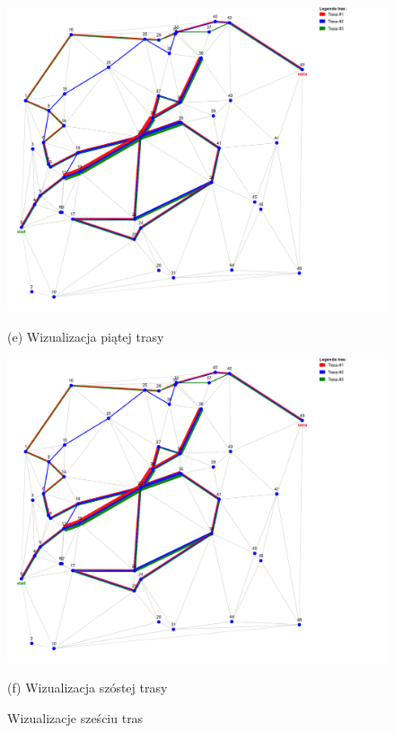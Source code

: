 \documentclass{article}
\begin{document}
\begin{figure}[H]
    \vspace{0.5em}
    \begin{minipage}[b]{0.48\linewidth}
        \includegraphics[width=\linewidth]{423C496B-894F-48DF-AD3A-845B3B00989B.png}
        \caption*{(e) Wizualizacja piątej trasy}
    \end{minipage}
    \hfill
    \begin{minipage}[b]{0.48\linewidth}
        \includegraphics[width=\linewidth]{423C496B-894F-48DF-AD3A-845B3B00989B.png}
        \caption*{(f) Wizualizacja szóstej trasy}
    \end{minipage}
    
    \caption{Wizualizacje sześciu tras}
    \label{fig:all-routes}
\end{figure}
\end{document}
